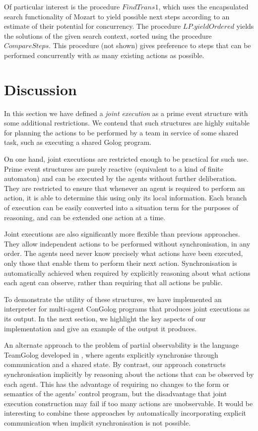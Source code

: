 Of particular interest is the procedure $FindTrans1$, which uses
the encapsulated search functionality of Mozart to yield possible
next steps according to an estimate of their potential for concurrency.
The procedure $LP.yieldOrdered$ yields the solutions of the given
search context, sorted using the procedure $CompareSteps$. This procedure
(not shown) gives preference to steps that can be performed concurrently
with as many existing actions as possible.


\section{Discussion\label{sec:JointExec:Discussion}}

In this section we have defined a \emph{joint execution} as a prime
event structure with some additional restrictions. We contend that
such structures are highly suitable for planning the actions to be
performed by a team in service of some shared task, such as executing
a shared Golog program.

On one hand, joint executions are restricted enough to be practical
for such use. Prime event structures are purely reactive (equivalent
to a kind of finite automaton) and can be executed by the agents without
further deliberation. They are restricted to ensure that whenever
an agent is required to perform an action, it is able to determine
this using only its local information. Each branch of execution can
be easily converted into a situation term for the purposes of reasoning,
and can be extended one action at a time.

Joint executions are also significantly more flexible than previous
approaches. They allow independent actions to be performed without
synchronisation, in any order. The agents need never know precisely
what actions have been executed, only those that enable them to perform
their next action. Synchronisation is automatically achieved when
required by explicitly reasoning about what actions each agent can
observe, rather than requiring that all actions be public.

To demonstrate the utility of these structures, we have implemented
an interpreter for multi-agent ConGolog programs that produces joint
executions as its output. In the next section, we highlight the key
aspects of our implementation and give an example of the output it
produces.

An alternate approach to the problem of partial observability is the
language TeamGolog developed in \citep{farinelli07team_golog}, where
agents explicitly synchronise through communication and a shared state.
By contrast, our approach constructs synchronisation implicitly by
reasoning about the actions that can be observed by each agent. This
has the advantage of requiring no changes to the form or semantics
of the agents' control program, but the disadvantage that joint execution
construction may fail if too many actions are unobservable. It would
be interesting to combine these approaches by automatically incorporating
explicit communication when implicit synchronisation is not possible.

